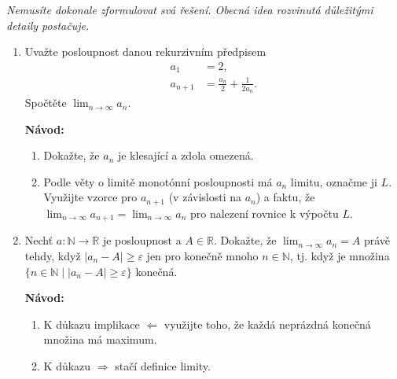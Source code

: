 \documentclass[a4paper,11pt]{article}
\newcommand{\R}{\mathbb{R}}
\newcommand{\N}{\mathbb{N}}
\begin{document}
 \begin{tcolorbox}[breakable,title=\textsf{Těžké úlohy a důkazy (12
  bodů)},arc=0mm,boxsep=3mm,bottomrule=1pt,toprule=1pt,leftrule=-0.1mm,
  rightrule=-0.1mm,colframe=BrickRed!80!white,colback=BrickRed!5!white]
  \emph{Nemusíte dokonale zformulovat svá řešení. Obecná idea rozvinutá
  důležitými detaily postačuje.}
  \begin{enumerate}
   \item Uvažte posloupnost danou rekurzivním předpisem
    \begin{align*}
     a_1 &= 2,\\
     a_{n+1} &= \frac{a_n}{2} + \frac{1}{2a_n}.
    \end{align*}
    Spočtěte $\lim_{n \to \infty} a_n$.
   
    \textbf{Návod:}
    \begin{enumerate}
     \item Dokažte, že $a_n$ je klesající a zdola omezená.
     \item Podle věty o limitě monotónní posloupnosti má $a_n$ limitu, označme
      ji $L$. Využijte vzorce pro $a_{n+1}$ (v závislosti na $a_n$) a faktu, že
      $\lim_{n \to \infty} a_{n+1} = \lim_{n \to \infty} a_n$ pro nalezení
      rovnice k výpočtu $L$.
    \end{enumerate}
   \item Nechť $a:\N \to \R$ je posloupnost a $A \in \R$. Dokažte, že $\lim_{n
    \to \infty} a_n = A$ právě tehdy, když $|a_n - A| \geq \varepsilon$ jen pro
    konečně mnoho $n \in \N$, tj. když je množina $\{n \in \N \mid |a_n-A| \geq
    \varepsilon\}$ konečná.
   
    \textbf{Návod:}
    \begin{enumerate}
     \item K důkazu implikace $ \Leftarrow $ využijte toho, že každá neprázdná
      konečná množina má maximum.
     \item K důkazu $ \Rightarrow $ stačí definice limity.
    \end{enumerate}
  \end{enumerate}
 \end{tcolorbox}
\end{document}
